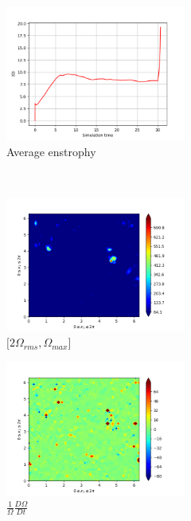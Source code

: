 \begin{figure}[H]
    \begin{subfigure}[H]{0.45\textwidth}
        \includegraphics[height=1.75in]{media/run-cds-65/enst-average1380.png}
        \caption{Average enstrophy}
    \end{subfigure}
    ~
    \begin{subfigure}[H]{0.45\textwidth}
        \includegraphics[height=1.75in]{media/run-cds-65/enst-2-1380.png}
        \caption{$[2\Omega_{rms}, \Omega_{max} $] }
    \end{subfigure}
    \newline
    \begin{subfigure}[H]{0.45\textwidth}
        \includegraphics[height=1.75in]{media/run-cds-65/enst-1380.png}
        \caption{$\frac{1}{\Omega} \frac{D \Omega}{Dt}$}
    \end{subfigure}
    ~
    \begin{subfigure}{0.45\textwidth}

\end{subfigure}
\end{figure}
